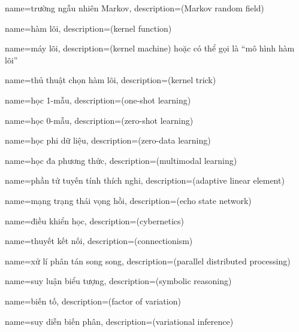 {
    name={trường ngẫu nhiên Markov},
    description={(Markov random field)}
}


{
    name={hàm lõi},
    description={(kernel function)}
}

{
    name={máy lõi},
    description={(kernel machine) hoặc có thể gọi là ``mô hình hàm lõi''}
}

{
    name={thủ thuật chọn hàm lõi},
    description={(kernel trick)}
}

{
    name={học 1-mẫu},
    description={(one-shot learning)}
}

{
    name={học 0-mẫu},
    description={(zero-shot learning)}
}

{
    name={học phi dữ liệu},
    description={(zero-data learning)}
}

{
    name={học đa phương thức},
    description={(multimodal learning)}
}

{
    name={phần tử tuyến tính thích nghi},
    description={(adaptive linear element)}
}


{
    name={mạng trạng thái vọng hồi},
    description={(echo state network)}
}


{
    name={điều khiển học},
    description={(cybernetics)}
}

{
    name={thuyết kết nối},
    description={(connectionism)}
}

{
    name={xử lí phân tán song song},
    description={(parallel distributed processing)}
}

{
    name={suy luận biểu tượng},
    description={(symbolic reasoning)}
}

{
    name={biến tố},
    description={(factor of variation)}
}

{
    name={suy diễn biến phân},
    description={(variational inference)}
}

